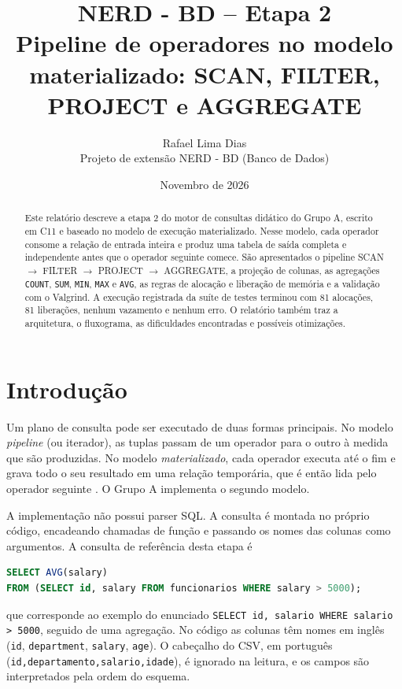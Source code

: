 \documentclass[11pt,a4paper]{article}
\title{NERD - BD -- Etapa 2\\\large Pipeline de operadores no modelo materializado: SCAN, FILTER, PROJECT e AGGREGATE}
\author{Rafael Lima Dias\\Projeto de extensão NERD - BD (Banco de Dados)}
\date{Novembro de 2026}
\begin{document}
\maketitle

\begin{abstract}
Este relatório descreve a etapa 2 do motor de consultas didático do Grupo A, escrito em C11 e baseado no modelo de execução materializado. Nesse modelo, cada operador consome a relação de entrada inteira e produz uma tabela de saída completa e independente antes que o operador seguinte comece. São apresentados o pipeline SCAN $\rightarrow$ FILTER $\rightarrow$ PROJECT $\rightarrow$ AGGREGATE, a projeção de colunas, as agregações \texttt{COUNT}, \texttt{SUM}, \texttt{MIN}, \texttt{MAX} e \texttt{AVG}, as regras de alocação e liberação de memória e a validação com o Valgrind. A execução registrada da suíte de testes terminou com 81 alocações, 81 liberações, nenhum vazamento e nenhum erro. O relatório também traz a arquitetura, o fluxograma, as dificuldades encontradas e possíveis otimizações.
\end{abstract}

\section{Introdução}
Um plano de consulta pode ser executado de duas formas principais. No modelo \emph{pipeline} (ou iterador), as tuplas passam de um operador para o outro à medida que são produzidas. No modelo \emph{materializado}, cada operador executa até o fim e grava todo o seu resultado em uma relação temporária, que é então lida pelo operador seguinte \cite{graefe,garcia}. O Grupo A implementa o segundo modelo.

A implementação não possui parser SQL. A consulta é montada no próprio código, encadeando chamadas de função e passando os nomes das colunas como argumentos. A consulta de referência desta etapa é
\par\medskip\noindent\begin{minipage}{\linewidth}
\begin{lstlisting}[language=SQL]
SELECT AVG(salary)
FROM (SELECT id, salary FROM funcionarios WHERE salary > 5000);
\end{lstlisting}
\end{minipage}\par\medskip
que corresponde ao exemplo do enunciado \texttt{SELECT id, salario WHERE salario > 5000}, seguido de uma agregação. No código as colunas têm nomes em inglês (\texttt{id}, \texttt{department}, \texttt{salary}, \texttt{age}). O cabeçalho do CSV, em português (\texttt{id,departamento,salario,idade}), é ignorado na leitura, e os campos são interpretados pela ordem do esquema.
\end{document}
